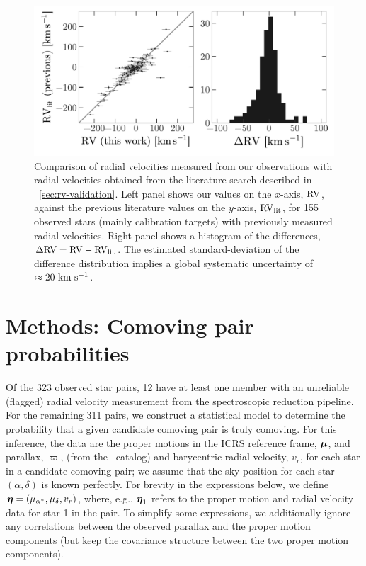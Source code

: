 \documentclass[modern, letterpaper]{aastex61}
\newcommand{\tgas}{\acronym{TGAS}}
\begin{document}
\begin{figure}[!ht]
  \begin{center}
    \includegraphics[width=0.85\linewidth]{rv-comparison.pdf}
  \end{center}
  \caption{%
    Comparison of radial velocities measured from our observations with radial
    velocities obtained from the literature search described in
    \sectionname~\ref{sec:rv-validation}.
    Left panel shows our values on the $x$-axis, ${\rm RV}$, against the
    previous literature values on the $y$-axis, ${\rm RV}_{\rm lit}$, for 155
    observed stars (mainly calibration targets) with previously measured radial
    velocities.
    Right panel shows a histogram of the differences, $\Delta{\rm RV} = {\rm RV}
    - {\rm RV}_{\rm lit}$.
    The estimated standard-deviation of the difference distribution implies a
    global systematic uncertainty of $\approx 20~\mathrm{km}~\mathrm{s}^{-1}$.
    \label{fig:compare-previous}}
\end{figure}

\section{Methods: Comoving pair probabilities}\label{sec:methods}


Of the 323 observed star pairs, 12 have at least one member with an unreliable
(flagged) radial velocity measurement from the spectroscopic reduction pipeline.
For the remaining 311 pairs, we construct a statistical model to determine the
probability that a given candidate comoving pair is truly comoving.
For this inference, the data are the proper motions in the ICRS reference frame,
$\boldsymbol{\mu}$, and parallax, $\varpi$, (from the \tgas\ catalog) and barycentric
radial velocity, $v_r$, for each star in a candidate comoving pair; we assume
that the sky position for each star $(\alpha, \delta)$ is known perfectly.
For brevity in the expressions below, we define $\boldsymbol{\eta} = (\mu_{\alpha^*},
\mu_\delta, v_r)$, where, e.g., $\boldsymbol{\eta}_1$ refers to the proper motion and
radial velocity data for star 1 in the pair.
To simplify some expressions, we additionally ignore any correlations between
the observed parallax and the proper motion components (but keep the covariance
structure between the two proper motion components).
\end{document}
